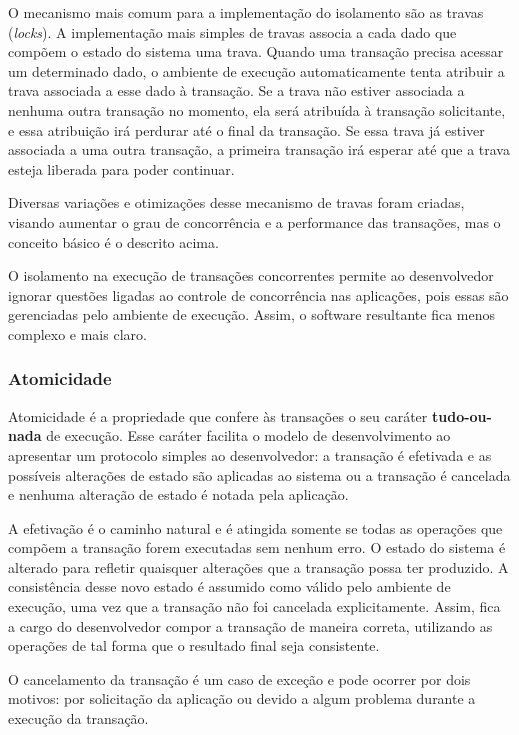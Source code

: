 \documentclass[11pt,twoside,a4paper]{book}
\begin{document}
O mecanismo mais comum para a implementação do isolamento são as travas (\emph{locks}). A implementação mais simples de travas associa a cada dado que compõem o estado do sistema uma trava. Quando uma transação precisa acessar um determinado dado, o ambiente de execução automaticamente tenta atribuir a trava associada a esse dado à transação. Se a trava não estiver associada a nenhuma outra transação no momento, ela será atribuída à transação solicitante, e essa atribuição irá perdurar até o final da transação. Se essa trava já estiver associada a uma outra transação, a primeira transação irá esperar até que a trava esteja liberada para poder continuar.

Diversas variações e otimizações desse mecanismo de travas foram criadas, visando aumentar o grau de concorrência e a performance das transações, mas o conceito básico é o descrito acima.

O isolamento na execução de transações concorrentes permite ao desenvolvedor ignorar questões ligadas ao controle de concorrência nas aplicações, pois essas são gerenciadas pelo ambiente de execução. Assim, o software resultante fica menos complexo e mais claro.

\subsubsection*{Atomicidade}
Atomicidade é a propriedade que confere às transações o seu caráter \textbf{tudo-ou-nada} de execução. Esse caráter facilita o modelo de desenvolvimento ao apresentar um protocolo simples ao desenvolvedor: a transação é efetivada e as possíveis alterações de estado são aplicadas ao sistema ou a transação é cancelada e nenhuma alteração de estado é notada pela aplicação. 

A efetivação é o caminho natural e é atingida somente se todas as operações que compõem a transação forem executadas sem nenhum erro. O estado do sistema é alterado para refletir quaisquer alterações que a transação possa ter produzido. A consistência desse novo estado é assumido como válido pelo ambiente de execução, uma vez que a transação não foi cancelada explicitamente. Assim, fica a cargo do desenvolvedor compor a transação de maneira correta, utilizando as operações de tal forma que o resultado final seja consistente.

O cancelamento da transação é um caso de exceção e pode ocorrer por dois motivos: por solicitação da aplicação ou devido a algum problema durante a execução da transação. 
\end{document}
